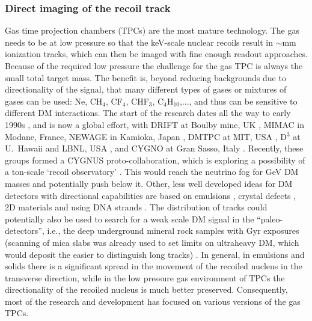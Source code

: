 \subsubsection*{Direct imaging of the recoil track} 
Gas time projection chambers (TPCs) are the most mature technology. 
The gas needs to be  at low pressure so that the  keV-scale nuclear recoils result in $\sim \text{mm}$ ionization tracks, 
which can then be imaged with fine enough readout approaches. Because of the required low pressure the challenge for the gas TPC is always the small total target mass. The benefit is, beyond reducing backgrounds due to directionality of the signal, that many different types of gases or mixtures of gases can be used: Ne, CH${}_4$, CF${}_4$, CHF${}_3$, C${}_4$H${}_{10}$,..., and thus can be sensitive to different DM interactions. The start of the research dates all the way to early 1990s \cite{Buckland:1994gc}, and is now a global effort, with DRIFT at Boulby mine, UK  \cite{DRIFT-II}, MIMAC in Modane, France\cite{MIMAC}, NEWAGE in Kamioka, Japan \cite{NEWAGE}, DMTPC at MIT, USA \cite{DMTPC}, D${}^3$ at U.\ Hawaii and LBNL, USA \cite{D3}, and CYGNO at Gran Sasso, Italy \cite{CYGNO}. Recently, these groups formed a CYGNUS proto-collaboration, which is exploring a possibility of a ton-scale `recoil observatory' \cite{CYGNUS}. This would reach the neutrino fog for GeV DM masses and potentially push below it. Other, less well developed ideas for DM detectors with directional capabilities are based on emulsions \cite{NEWSdm}, crystal defects \cite{CrystalDefectsDM}, 2D materials \cite{Hochberg:2016ntt,PTOLEMY} and using DNA strands \cite{Drukier:2012hj}. The distribution of tracks could potentially also  be used to search for a weak scale DM signal in the ``paleo-detectors'', i.e., the deep underground mineral rock samples with Gyr exposures (scanning of mica slabs was already used to set limits on ultraheavy DM, which would deposit the easier  to distinguish long tracks) \cite{Paleodetectors}. In general, in emulsions and solids there is a significant spread in the movement of the recoiled nucleus in the transverse direction, while in the low pressure gas environment of TPCs the directionality of the recoiled nucleus is much better preserved. Consequently, most of the research and development has focused on various versions of  the gas TPCs.  

